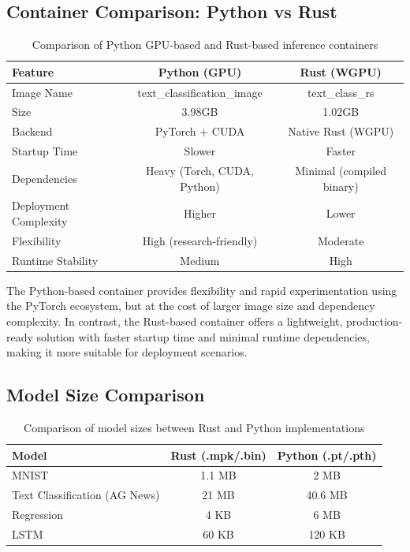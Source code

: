 \documentclass{ieeeaccess}
\begin{document}
\subsection{Container Comparison: Python vs Rust}

\begin{table}[t!]
\centering
\begin{tabular}{|l|c|c|}
\hline
\textbf{Feature} & \textbf{Python (GPU)} & \textbf{Rust (WGPU)} \\
\hline
Image Name & text\_classification\_image & text\_class\_rs \\
\hline
Size &  3.98GB &  1.02GB \\
\hline
Backend & PyTorch + CUDA & Native Rust (WGPU) \\
\hline
Startup Time & Slower & Faster \\
\hline
Dependencies & Heavy (Torch, CUDA, Python) & Minimal (compiled binary) \\
\hline
Deployment Complexity & Higher & Lower \\
\hline
Flexibility & High (research-friendly) & Moderate \\
\hline
Runtime Stability & Medium & High \\
\hline
\end{tabular}
\caption{Comparison of Python GPU-based and Rust-based inference containers}
\end{table}

\noindent
The Python-based container provides flexibility and rapid experimentation using the PyTorch ecosystem, but at the cost of larger image size and dependency complexity. In contrast, the Rust-based container offers a lightweight, production-ready solution with faster startup time and minimal runtime dependencies, making it more suitable for deployment scenarios.

\subsection{Model Size Comparison}

\begin{table}[t!]
\centering
\begin{tabular}{|l|c|c|}
\hline
\textbf{Model} & \textbf{Rust (.mpk/.bin)} & \textbf{Python (.pt/.pth)} \\
\hline
MNIST & 1.1 MB & 2 MB \\
\hline
Text Classification (AG News) & 21 MB & 40.6 MB \\
\hline
Regression & 4 KB & 6 MB \\
\hline
LSTM & 60 KB & 120 KB \\
\hline
\end{tabular}
\caption{Comparison of model sizes between Rust and Python implementations}
\end{table}
\end{document}
